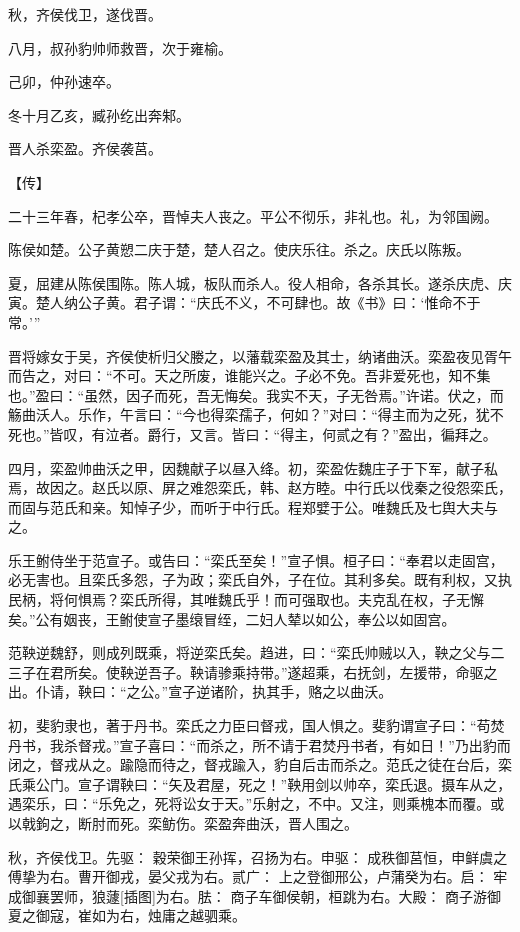 \documentclass[a4paper,12pt,UTF8,twoside]{ctexbook}
\begin{document}
秋，齐侯伐卫，遂伐晋。

八月，叔孙豹帅师救晋，次于雍榆。

己卯，仲孙速卒。

冬十月乙亥，臧孙纥出奔邾。

晋人杀栾盈。齐侯袭莒。

【传】

二十三年春，杞孝公卒，晋悼夫人丧之。平公不彻乐，非礼也。礼，为邻国阙。

陈侯如楚。公子黄愬二庆于楚，楚人召之。使庆乐往。杀之。庆氏以陈叛。

夏，屈建从陈侯围陈。陈人城，板队而杀人。役人相命，各杀其长。遂杀庆虎、庆寅。楚人纳公子黄。君子谓：“庆氏不义，不可肆也。故《书》曰：‘惟命不于常。’”

晋将嫁女于吴，齐侯使析归父媵之，以藩载栾盈及其士，纳诸曲沃。栾盈夜见胥午而告之，对曰：“不可。天之所废，谁能兴之。子必不免。吾非爱死也，知不集也。”盈曰：“虽然，因子而死，吾无悔矣。我实不天，子无咎焉。”许诺。伏之，而觞曲沃人。乐作，午言曰：“今也得栾孺子，何如？”对曰：“得主而为之死，犹不死也。”皆叹，有泣者。爵行，又言。皆曰：“得主，何贰之有？”盈出，徧拜之。

四月，栾盈帅曲沃之甲，因魏献子以昼入绛。初，栾盈佐魏庄子于下军，献子私焉，故因之。赵氏以原、屏之难怨栾氏，韩、赵方睦。中行氏以伐秦之役怨栾氏，而固与范氏和亲。知悼子少，而听于中行氏。程郑嬖于公。唯魏氏及七舆大夫与之。

乐王鲋侍坐于范宣子。或告曰：“栾氏至矣！”宣子惧。桓子曰：“奉君以走固宫，必无害也。且栾氏多怨，子为政；栾氏自外，子在位。其利多矣。既有利权，又执民柄，将何惧焉？栾氏所得，其唯魏氏乎！而可强取也。夫克乱在权，子无懈矣。”公有姻丧，王鲋使宣子墨缞冒绖，二妇人辇以如公，奉公以如固宫。

范鞅逆魏舒，则成列既乘，将逆栾氏矣。趋进，曰：“栾氏帅贼以入，鞅之父与二三子在君所矣。使鞅逆吾子。鞅请骖乘持带。”遂超乘，右抚剑，左援带，命驱之出。仆请，鞅曰：“之公。”宣子逆诸阶，执其手，赂之以曲沃。

初，斐豹隶也，著于丹书。栾氏之力臣曰督戎，国人惧之。斐豹谓宣子曰：“苟焚丹书，我杀督戎。”宣子喜曰：“而杀之，所不请于君焚丹书者，有如日！”乃出豹而闭之，督戎从之。踰隐而待之，督戎踰入，豹自后击而杀之。范氏之徒在台后，栾氏乘公门。宣子谓鞅曰：“矢及君屋，死之！”鞅用剑以帅卒，栾氏退。摄车从之，遇栾乐，曰：“乐免之，死将讼女于天。”乐射之，不中。又注，则乘槐本而覆。或以戟鉤之，断肘而死。栾鲂伤。栾盈奔曲沃，晋人围之。

秋，齐侯伐卫。先驱： 穀荣御王孙挥，召扬为右。申驱： 成秩御莒恒，申鲜虞之傅挚为右。曹开御戎，晏父戎为右。贰广： 上之登御邢公，卢蒲癸为右。启： 牢成御襄罢师，狼蘧[插图]为右。胠： 商子车御侯朝，桓跳为右。大殿： 商子游御夏之御寇，崔如为右，烛庸之越驷乘。
\end{document}
